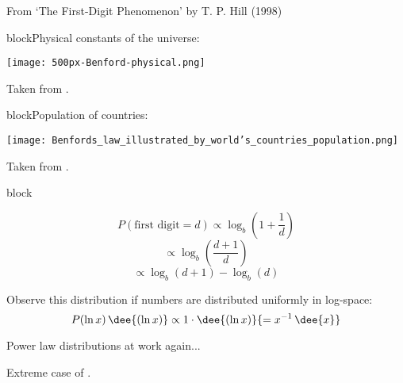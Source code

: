   {\small From `The First-Digit Phenomenon' by T. P. Hill (1998)\cite{hill1998a}}
  



{block}{Physical constants of the universe:}

    \medskip

    \begin{center}
      \texttt{[image: 500px-Benford-physical.png]}
    \end{center}
  

   Taken from .

{block}{Population of countries:}

    \medskip

    \begin{center}
      \texttt{[image: Benfords\_law\_illustrated\_by\_world's\_countries\_population.png]}
    \end{center}
  

   Taken from .

{block}{}
  
   
    $$ 
    P(\mbox{first digit} = d) \propto
    \log_b \left( 1 + \frac{1}{d} \right) 
    $$
    {
      $$ 
      \propto
      \log_b \left( \frac{d + 1}{d} \right) 
      $$
    }
    {
      $$ 
      \propto
      \log_b \left(d + 1 \right) 
      -
      \log_b \left(d \right) 
      $$
    }
  
    Observe this distribution if numbers are distributed uniformly in log-space:
    $$
    P(\ln{x})\, \dee{(\ln{x})} \propto 1 \cdot \dee{(\ln{x})} 
    {= x^{-1}\, \dee{x}}
    $$
  
    Power law distributions at work again...  
  
    Extreme case of .
  
